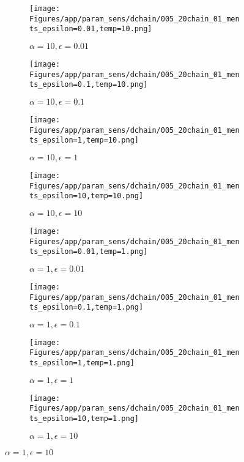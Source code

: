 \documentclass{article}
\theoremstyle{plain}
\begin{document}
\begin{appendices}
\begin{figure}
                \begin{subfigure}[b]{0.24\textwidth}
                    \centering
                    \texttt{[image: Figures/app/param\_sens/dchain/005\_20chain\_01\_ments\_epsilon=0.01,temp=10.png]}
                    \caption*{$\alpha=10,\epsilon=0.01$}
                \end{subfigure}
                \begin{subfigure}[b]{0.24\textwidth}
                    \centering
                    \texttt{[image: Figures/app/param\_sens/dchain/005\_20chain\_01\_ments\_epsilon=0.1,temp=10.png]}
                    \caption*{$\alpha=10,\epsilon=0.1$}
                \end{subfigure}
                \begin{subfigure}[b]{0.24\textwidth}
                    \centering
                    \texttt{[image: Figures/app/param\_sens/dchain/005\_20chain\_01\_ments\_epsilon=1,temp=10.png]}
                    \caption*{$\alpha=10,\epsilon=1$}
                \end{subfigure}
                \begin{subfigure}[b]{0.24\textwidth}
                    \centering
                    \texttt{[image: Figures/app/param\_sens/dchain/005\_20chain\_01\_ments\_epsilon=10,temp=10.png]}
                    \caption*{$\alpha=10,\epsilon=10$}
                \end{subfigure}
                
                \begin{subfigure}[b]{0.24\textwidth}
                    \centering
                    \texttt{[image: Figures/app/param\_sens/dchain/005\_20chain\_01\_ments\_epsilon=0.01,temp=1.png]}
                    \caption*{$\alpha=1,\epsilon=0.01$}
                \end{subfigure}
                \begin{subfigure}[b]{0.24\textwidth}
                    \centering
                    \texttt{[image: Figures/app/param\_sens/dchain/005\_20chain\_01\_ments\_epsilon=0.1,temp=1.png]}
                    \caption*{$\alpha=1,\epsilon=0.1$}
                \end{subfigure}
                \begin{subfigure}[b]{0.24\textwidth}
                    \centering
                    \texttt{[image: Figures/app/param\_sens/dchain/005\_20chain\_01\_ments\_epsilon=1,temp=1.png]}
                    \caption*{$\alpha=1,\epsilon=1$}
                \end{subfigure}
                \begin{subfigure}[b]{0.24\textwidth}
                    \centering
                    \texttt{[image: Figures/app/param\_sens/dchain/005\_20chain\_01\_ments\_epsilon=10,temp=1.png]}
                    \caption*{$\alpha=1,\epsilon=10$}
                \end{subfigure}
                

\end{figure}
\end{appendices}
\end{document}
